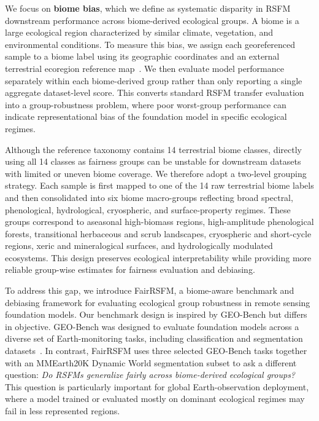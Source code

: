 \documentclass[10pt,twocolumn,letterpaper]{article}
\newcommand{\method}{FairRSFM\xspace}
\begin{document}
We focus on \textbf{biome bias}, which we define as systematic disparity in RSFM downstream performance across biome-derived ecological groups. A biome is a large ecological region characterized by similar climate, vegetation, and environmental conditions. To measure this bias, we assign each georeferenced sample to a biome label using its geographic coordinates and an external terrestrial ecoregion reference map~\cite{terrestrialecoregions,ecoregions2017}. We then evaluate model performance separately within each biome-derived group rather than only reporting a single aggregate dataset-level score. This converts standard RSFM transfer evaluation into a group-robustness problem, where poor worst-group performance can indicate representational bias of the foundation model in specific ecological regimes.

Although the reference taxonomy contains 14 terrestrial biome classes, directly using all 14 classes as fairness groups can be unstable for downstream datasets with limited or uneven biome coverage. We therefore adopt a two-level grouping strategy. Each sample is first mapped to one of the 14 raw terrestrial biome labels and then consolidated into six biome macro-groups reflecting broad spectral, phenological, hydrological, cryospheric, and surface-property regimes. These groups correspond to aseasonal high-biomass regions, high-amplitude phenological forests, transitional herbaceous and scrub landscapes, cryospheric and short-cycle regions, xeric and mineralogical surfaces, and hydrologically modulated ecosystems. This design preserves ecological interpretability while providing more reliable group-wise estimates for fairness evaluation and debiasing.

To address this gap, we introduce \method, a biome-aware benchmark and debiasing framework for evaluating ecological group robustness in remote sensing foundation models. Our benchmark design is inspired by GEO-Bench but differs in objective. GEO-Bench was designed to evaluate foundation models across a diverse set of Earth-monitoring tasks, including classification and segmentation datasets~\cite{geobench}. In contrast, \method uses three selected GEO-Bench tasks together with an MMEarth20K Dynamic World segmentation subset to ask a different question: \emph{Do RSFMs generalize fairly across biome-derived ecological groups?} This question is particularly important for global Earth-observation deployment, where a model trained or evaluated mostly on dominant ecological regimes may fail in less represented regions.
\end{document}
